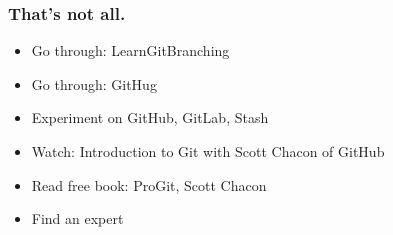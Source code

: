 \documentclass{beamer}
\begin{document}
		\begin{frame}
			\frametitle{That's not all.}
			\begin{itemize}
                \item Go through: LearnGitBranching
                \item Go through: GitHug
                \item Experiment on GitHub, GitLab, Stash
                \item Watch: Introduction to Git with Scott Chacon of GitHub
                \item Read free book: ProGit, Scott Chacon
                \item Find an expert
			\end{itemize}
		\end{frame}
		
\end{document}
